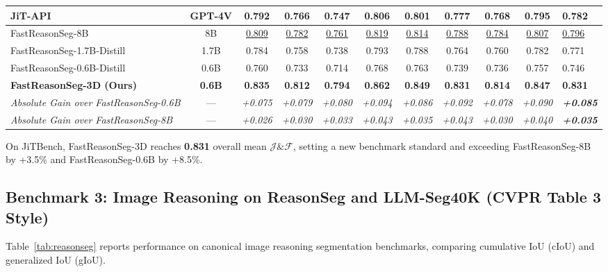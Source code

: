 \documentclass[10pt,twocolumn,letterpaper]{article}
\begin{document}
\begin{table}[t]
\begin{tabular*}{\textwidth}{@{\extracolsep{\fill}}lccccccccc}
JiT-API & GPT-4V & 0.792 & 0.766 & 0.747 & 0.806 & 0.801 & 0.777 & 0.768 & 0.795 & 0.782 \\
\midrule
FastReasonSeg-8B~\cite{shen2026fast} & 8B & \underline{0.809} & \underline{0.782} & \underline{0.761} & \underline{0.819} & \underline{0.814} & \underline{0.788} & \underline{0.784} & \underline{0.807} & \underline{0.796} \\
FastReasonSeg-1.7B-Distill~\cite{shen2026fast} & 1.7B & 0.784 & 0.758 & 0.738 & 0.793 & 0.788 & 0.764 & 0.760 & 0.782 & 0.771 \\
FastReasonSeg-0.6B-Distill~\cite{shen2026fast} & 0.6B & 0.760 & 0.733 & 0.714 & 0.768 & 0.763 & 0.739 & 0.736 & 0.757 & 0.746 \\
\midrule
\textbf{FastReasonSeg-3D (Ours)} & \textbf{0.6B} & \textbf{0.835} & \textbf{0.812} & \textbf{0.794} & \textbf{0.862} & \textbf{0.849} & \textbf{0.831} & \textbf{0.814} & \textbf{0.847} & \textbf{0.831} \\
\textit{Absolute Gain over FastReasonSeg-0.6B} & — & \textit{+0.075} & \textit{+0.079} & \textit{+0.080} & \textit{+0.094} & \textit{+0.086} & \textit{+0.092} & \textit{+0.078} & \textit{+0.090} & \textit{\textbf{+0.085}} \\
\textit{Absolute Gain over FastReasonSeg-8B} & — & \textit{+0.026} & \textit{+0.030} & \textit{+0.033} & \textit{+0.043} & \textit{+0.035} & \textit{+0.043} & \textit{+0.030} & \textit{+0.040} & \textit{\textbf{+0.035}} \\
\bottomrule
\end{tabular*}
\end{table}

On JiTBench, FastReasonSeg-3D reaches \textbf{0.831} overall mean $\mathcal{J}\&\mathcal{F}$, setting a new benchmark standard and exceeding FastReasonSeg-8B by +3.5\% and FastReasonSeg-0.6B by +8.5\%.

\subsection{Benchmark 3: Image Reasoning on ReasonSeg and LLM-Seg40K (CVPR Table 3 Style)}
Table~\ref{tab:reasonseg} reports performance on canonical image reasoning segmentation benchmarks, comparing cumulative IoU (cIoU) and generalized IoU (gIoU).
\end{document}
